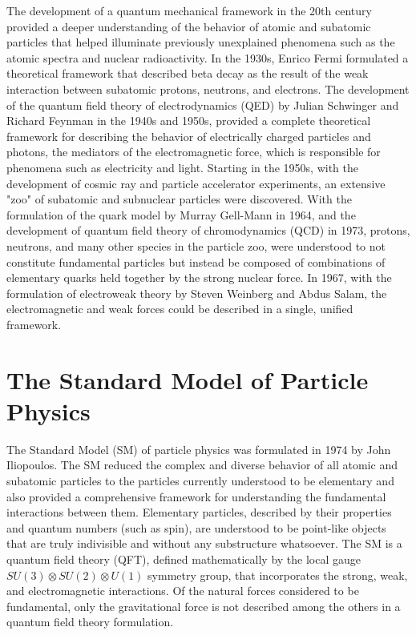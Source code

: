 The development of a quantum mechanical framework in the 20th century provided a deeper understanding of the behavior of atomic and subatomic particles that helped illuminate previously unexplained phenomena such as the atomic spectra and nuclear radioactivity.
In the 1930s, Enrico Fermi formulated a theoretical framework that described beta decay as the result of the weak interaction between subatomic protons, neutrons, and electrons.
The development of the quantum field theory of electrodynamics (QED) by Julian Schwinger and Richard Feynman in the 1940s and 1950s, provided a complete theoretical framework for describing the behavior of electrically charged particles and photons, the mediators of the electromagnetic force, which is responsible for phenomena such as electricity and light.
Starting in the 1950s, with the development of cosmic ray and particle accelerator experiments, an extensive "zoo" of subatomic and subnuclear particles were discovered.
With the formulation of the quark model by Murray Gell-Mann in 1964, and the development of quantum field theory of chromodynamics (QCD) in 1973, protons, neutrons, and many other species in the particle zoo, were understood to not constitute fundamental particles but instead be composed of combinations of elementary quarks held together by the strong nuclear force.
In 1967, with the formulation of electroweak theory by Steven Weinberg and Abdus Salam, the electromagnetic and weak forces could be described in a single, unified framework.

\section{The Standard Model of Particle Physics}
The Standard Model (SM) of particle physics was formulated in 1974 by John Iliopoulos.
The SM reduced the complex and diverse behavior of all atomic and subatomic particles to the particles currently understood to be elementary and also provided a comprehensive framework for understanding the fundamental interactions between them. 
Elementary particles, described by their properties and quantum numbers (such as spin), are understood to be point-like objects that are truly indivisible and without any substructure whatsoever.
The SM is a quantum field theory (QFT), defined mathematically by the local gauge $SU(3) \otimes SU(2) \otimes U(1)$ symmetry group, that incorporates the strong, weak, and electromagnetic interactions.
Of the natural forces considered to be fundamental, only the gravitational force is not described among the others in a quantum field theory formulation.

